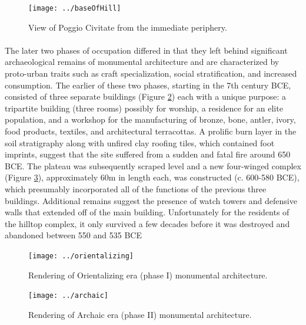 \documentclass[12pt,a4paper]{thesis}
\begin{document}
\begin{figure}
\centering
\texttt{[image: ../baseOfHill]}
\caption{View of Poggio Civitate from the immediate periphery.}
\label{fig:baseOfHill}
\end{figure}

\paragraph{}
The later two phases of occupation differed in that they left behind significant archaeological remains of monumental architecture and are characterized by proto-urban traits such as craft specialization, social stratification, and increased consumption. The earlier of these two phases, starting in the 7th century BCE, consisted of three separate buildings (Figure \ref{fig:orientalizing}) each with a unique purpose: a tripartite building (three rooms) possibly for worship, a residence for an elite population, and a workshop for the manufacturing of bronze, bone, antler, ivory, food products, textiles, and architectural terracottas. A prolific burn layer in the soil stratigraphy along with unfired clay roofing tiles, which contained foot imprints, suggest that the site suffered from a sudden and fatal fire around 650 BCE. The plateau was subsequently scraped level and a new four-winged  complex (Figure \ref{fig:archaic}), approximately 60m in length each, was constructed (c. 600-580 BCE), which presumably incorporated all of the functions of the previous three buildings. Additional remains suggest the presence of watch towers and defensive walls that extended off of the main building. Unfortunately for the residents of the hilltop complex, it only survived a few decades before it was destroyed and abandoned between 550 and 535 BCE \cite[p. 35-45]{NieTuc01}

\begin{figure}
\centering
\texttt{[image: ../orientalizing]}
\caption{Rendering of Orientalizing era (phase I) monumental architecture.}
\label{fig:orientalizing}
\end{figure}

\begin{figure}
\centering
\texttt{[image: ../archaic]}
\caption{Rendering of Archaic era (phase II) monumental architecture.}
\label{fig:archaic}
\end{figure}
\end{document}
